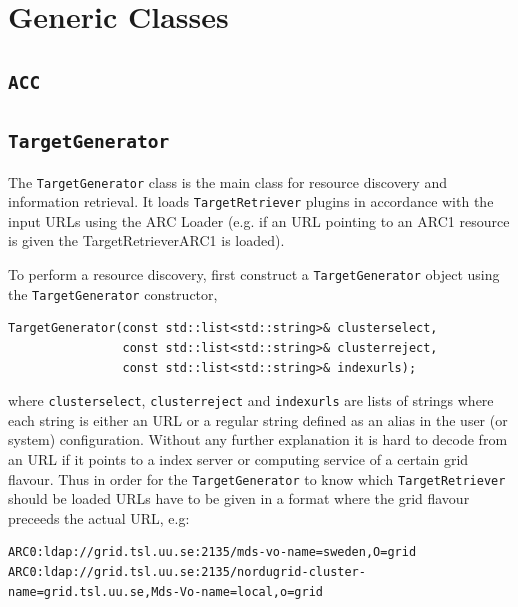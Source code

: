 \documentclass{book}
\newcommand{\ACC}{\texttt{ACC}}
\newcommand{\TargetGenerator}{\texttt{TargetGenerator}}
\newcommand{\TargetRetriever}{\texttt{TargetRetriever}}
\begin{document}
\section{Generic Classes}
\subsection{{\ACC}}

\subsection{{\TargetGenerator}} The {\TargetGenerator} class is the main class for resource discovery and information retrieval. It loads 
{\TargetRetriever} plugins in accordance with the input URLs using the ARC Loader (e.g. if an URL pointing to an ARC1 resource is given 
the TargetRetrieverARC1 is loaded).

To perform a resource discovery, first construct a {\TargetGenerator} object using the {\TargetGenerator} constructor,

\begin{shaded}
\begin{verbatim}
TargetGenerator(const std::list<std::string>& clusterselect,
                const std::list<std::string>& clusterreject,
                const std::list<std::string>& indexurls);
\end{verbatim}
\end{shaded}

where \texttt{clusterselect}, \texttt{clusterreject} and \texttt{indexurls} are lists of strings where each string is either 
an URL or a regular string defined as an alias in the user (or system) configuration. Without any further explanation it is 
hard to decode from an URL if it points to a index server or computing service of a certain grid flavour. Thus in order for 
the {\TargetGenerator} to know which {\TargetRetriever} should be loaded URLs have to be given in a format where the grid 
flavour preceeds the actual URL, e.g:

\begin{shaded}
\begin{small}
\begin{verbatim}
ARC0:ldap://grid.tsl.uu.se:2135/mds-vo-name=sweden,O=grid
ARC0:ldap://grid.tsl.uu.se:2135/nordugrid-cluster-name=grid.tsl.uu.se,Mds-Vo-name=local,o=grid
\end{verbatim}
\end{small}
\end{shaded}
\end{document}
